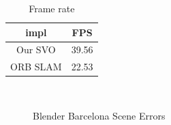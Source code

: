 \documentclass[11pt,a4paper,titlepage,oneside]{report}
\begin{document}
\begin{table}[H]
  \centering
  \begin{tabular}{|c|c|}
  impl & FPS\\
  \hline
  Our SVO & 39.56\\
  ORB SLAM & 22.53
\end{tabular}
\caption{Frame rate}
\label{tab:barcelona_fps}
\end{table}

\begin{figure}[H]
  \\
  \caption{Blender Barcelona Scene Errors}\label{fig:blender_barcelona_diff}
\end{figure}
\end{document}
